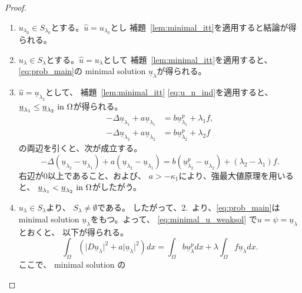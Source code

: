 \begin{proof}
 \begin{enumerate}[1.] \sage
  \item $u_{\lambda_0} \in S_{\lambda_0}$とする。$\hat{u} =
        u_{\lambda_0}$とし
        補題~\ref{lem:minimal_itt}を適用すると結論が得られる。
  \item $u_{\lambda} \in S_{\lambda}$とする。$\hat{u} =
        u_{\lambda}$として
        補題~\ref{lem:minimal_itt}を適用すると、
        \ref{eq:prob_main}の
        minimal solution $\underline{u}_\lambda$が得られる。
  \item $\hat{u} = \underline{u}_{\lambda_2}$として、
        補題~\ref{lem:minimal_itt}
        \eqref{eq:u_n_ind}を適用すると、
        $\underline{u}_{\lambda_1} \leq
        \underline{u}_{\lambda_2} ~\text{in}~ \Omega$が得られる。
        \begin{align*}
         -\Delta \underline{u}_{\lambda_1} + a
         \underline{u}_{\lambda_1} 
         &= b \underline{u}_{\lambda_1}^p + \lambda_1 f, \\
         -\Delta \underline{u}_{\lambda_2} + a
         \underline{u}_{\lambda_2} 
         &= b \underline{u}_{\lambda_2}^p + \lambda_2 f
        \end{align*}
        の両辺を引くと、次が成立する。
        \[
         -\Delta (\underline{u}_{\lambda_2} - \underline{u}_{\lambda_1}) + a
         (\underline{u}_{\lambda_2} - \underline{u}_{\lambda_1} )
         = b (\underline{u}_{\lambda_2}^p -
        \underline{u}_{\lambda_2}) + (\lambda_2 - \lambda_1) f.
        \]
        右辺が$0$以上であること、および、
        $a > -\kappa_1$により、強最大値原理を用いると、
        $\underline{u}_{\lambda_1} <
        \underline{u}_{\lambda_2} ~\text{in}~ \Omega$がしたがう。
  \item $u_\lambda \in S_\lambda$より、
        $S_\lambda \neq \emptyset$である。
        したがって、2.~より、\ref{eq:prob_main}は minimal solution
        $\underline{u}_\lambda$をもつ。よって、
        \eqref{eq:minimal_u_weaksol}
        で$u = \psi = \underline{u}_\lambda$とおくと、
        以下が得られる。
        \begin{equation}
         \int_\Omega \left( \lvert D\underline{u}_\lambda \rvert^2 + a
                      \lvert \underline{u}_\lambda \rvert^2 \right) dx 
          = \int_\Omega b\underline{u}_\lambda^p dx 
          + \lambda \int_\Omega f \underline{u}_\lambda dx.
          \label{eq:minimal_inp_same_weak}
        \end{equation}
        ここで、
        minimal solution の

\end{enumerate}
\end{proof}

